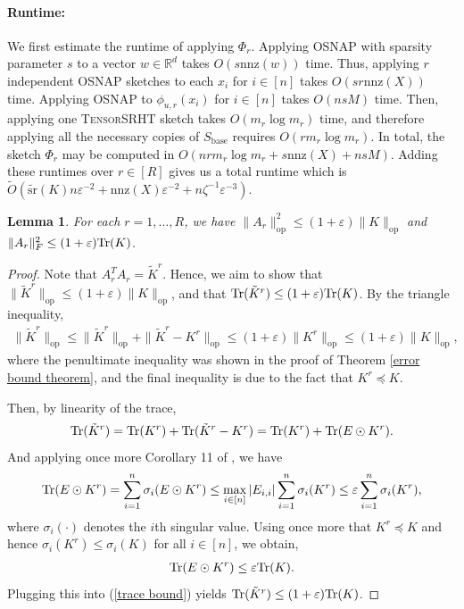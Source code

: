 \documentclass{article}
\theoremstyle{plain}
\newtheorem{lemma}[theorem]{Lemma}
\theoremstyle{definition}
\theoremstyle{remark}
\newcommand{\numeq}[1]{\begin{align}#1\end{align}}
\newcommand{\eq}[1]{\begin{align*}#1\end{align*}}
\newcommand{\R}{\mathbb{R}}
\newcommand{\Tr}{\textnormal{Tr}}
\begin{document}
\paragraph{Runtime:} We first estimate the runtime of applying $\Phi_r$. Applying \textsc{OSNAP} with sparsity parameter $s$ to a vector $w\in\R^d$ takes $O(s\text{nnz}(w))$ time. Thus, applying $r$ independent  \textsc{OSNAP}  sketches to each $x_i$ for $i\in[n]$ takes $O(sr\text{nnz}(X))$ time. Applying \textsc{OSNAP} to $\phi_{u,r}(x_i)$ for $i\in[n]$ takes $O(nsM)$ time.  
Then, applying one \textsc{TensorSRHT} sketch takes $O(m_r\log m_r)$ time, and therefore applying all the necessary copies of $S_\text{base}$ requires $O(r m_r\log m_r)$. In total, the sketch $\Phi_r$ may be computed in $O(n r m_r\log m_r + s\text{nnz}(X) + nsM)$. Adding these runtimes over $r\in [R]$ gives us a total runtime which is $\tilde O(\tilde{\text{sr}}(K)n\varepsilon^{-2}+\text{nnz}(X)\varepsilon^{-2}+n\zeta^{-1}\varepsilon^{-3})$.\\

\begin{lemma}\label{A norm bounds}
For each $r=1,\dots, R$, we have $\|A_r\|_\text{op}^2\leq (1+\varepsilon)\|K\|_\text{op}$ and $\|A_r\|_F^2 \leq (1+\varepsilon)\Tr(K)$.
\end{lemma}

\begin{proof}
Note that $A_r^T A_r = \tilde K^r$. Hence, we aim to show that $\|\tilde K^r\|_\text{op}\leq (1+\varepsilon)\|K\|_\text{op}$, and that $\Tr(\tilde K^r) \leq(1+\varepsilon)\Tr(K)$. By the triangle inequality, 
\eq{
\|\tilde K^r\|_\text{op} \leq \|\tilde K^r\|_\text{op} + \|\tilde K^r - K^r\|_\text{op} \leq (1+\varepsilon)\|K^r\|_\text{op} \leq (1+\varepsilon)\|K\|_\text{op},
}
where the penultimate inequality was shown in the proof of Theorem \ref{error bound theorem}, and the final inequality is due to the fact that $K^r\preceq K$. 

Then, by linearity of the trace,
\numeq{
\Tr(\tilde K^r) = \Tr(K^r) + \Tr(\tilde K^r - K^r)  =\Tr(K^r) + \Tr(E\odot K^r). \label{trace bound}
}
And applying once more Corollary 11 of \cite{ando1987singular}, we have
\eq{
\Tr(E\odot K^r)  = \sum_{i=1}^n \sigma_i(E\odot K^r) \leq \max_{i\in[n]} |E_{i,i}| \sum_{i=1}^n \sigma_i(K^r) \leq \varepsilon \sum_{i=1}^n \sigma_i(K^r),
}
where $\sigma_i(\cdot)$ denotes the $i$th singular value. Using once more that $K^r\preceq K$ and hence $\sigma_i(K^r)\leq \sigma_i(K)$ for all $i\in[n]$, we obtain,
\eq{
\Tr(E\odot K^r) \leq \varepsilon \Tr(K).
}
Plugging this into (\ref{trace bound}) yields $\Tr(\tilde K^r) \leq(1+\varepsilon)\Tr(K)$.
\end{proof}
\end{document}
